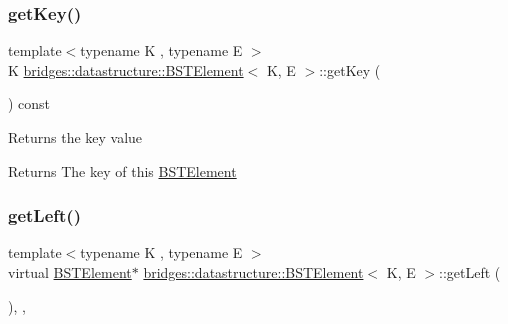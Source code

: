 \mbox{\label{classbridges_1_1datastructure_1_1_b_s_t_element_a66bd1d5874e4e0c8048e03e5fff07f86}} 
\subsubsection{\texorpdfstring{getKey()}{getKey()}}
{\footnotesize\ttfamily template$<$typename K , typename E $>$ \\
K \mbox{\hyperlink{classbridges_1_1datastructure_1_1_b_s_t_element}{bridges\+::datastructure\+::\+B\+S\+T\+Element}}$<$ K, E $>$\+::get\+Key (\begin{DoxyParamCaption}{ }\end{DoxyParamCaption}) const\hspace{0.3cm}{\ttfamily [inline]}}

Returns the key value \begin{DoxyReturn}{Returns}
The key of this \mbox{\hyperlink{classbridges_1_1datastructure_1_1_b_s_t_element}{B\+S\+T\+Element}} 
\end{DoxyReturn}
\mbox{\label{classbridges_1_1datastructure_1_1_b_s_t_element_af863c624691c11db26ae3b6d723d1f5c}} 
\subsubsection{\texorpdfstring{getLeft()}{getLeft()}\hspace{0.1cm}{\footnotesize\ttfamily [1/2]}}
{\footnotesize\ttfamily template$<$typename K , typename E $>$ \\
virtual \mbox{\hyperlink{classbridges_1_1datastructure_1_1_b_s_t_element}{B\+S\+T\+Element}}$\ast$ \mbox{\hyperlink{classbridges_1_1datastructure_1_1_b_s_t_element}{bridges\+::datastructure\+::\+B\+S\+T\+Element}}$<$ K, E $>$\+::get\+Left (\begin{DoxyParamCaption}{ }\end{DoxyParamCaption})\hspace{0.3cm}{\ttfamily [inline]}, {\ttfamily [override]}, {\ttfamily [virtual]}}

